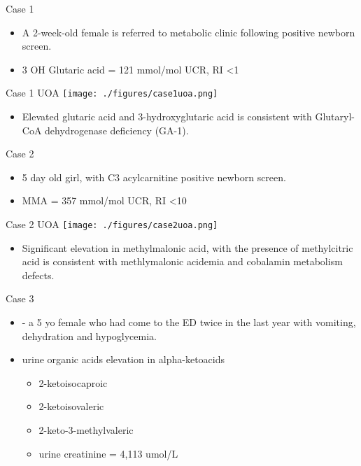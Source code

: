 \documentclass[presentation, smaller]{beamer}
\begin{document}
\begin{frame}[label={sec:orgheadline16}]{Case 1}
\begin{itemize}
\item A 2-week-old female is referred to metabolic clinic following positive newborn screen.
\item 3 OH Glutaric acid = 121 mmol/mol UCR, RI <1
\end{itemize}
\end{frame}

\begin{frame}[label={sec:orgheadline17}]{Case 1 UOA}
\texttt{[image: ./figures/case1uoa.png]}

\pause

\begin{itemize}
\item Elevated glutaric acid and 3-hydroxyglutaric acid is consistent with
Glutaryl-CoA dehydrogenase deficiency (GA-1).
\end{itemize}
\end{frame}

\begin{frame}[label={sec:orgheadline18}]{Case 2}
\begin{itemize}
\item 5 day old girl, with C3 acylcarnitine positive newborn screen.
\item MMA = 357 mmol/mol UCR, RI <10
\end{itemize}
\end{frame}


\begin{frame}[label={sec:orgheadline19}]{Case 2 UOA}
\texttt{[image: ./figures/case2uoa.png]}

\pause

\begin{itemize}
\item Significant elevation in methylmalonic acid, with the presence of
methylcitric acid is consistent with methlymalonic acidemia
and cobalamin metabolism defects.
\end{itemize}
\end{frame}

\begin{frame}[label={sec:orgheadline20}]{Case 3}
\begin{itemize}
\item - a 5 yo female who had come to the ED twice in the last year with
vomiting, dehydration and hypoglycemia.

\item urine organic acids elevation in alpha-ketoacids 
\begin{itemize}
\item 2-ketoisocaproic
\item 2-ketoisovaleric
\item 2-keto-3-methylvaleric
\item urine creatinine = 4,113 umol/L
\end{itemize}
\end{itemize}
\end{frame}
\end{document}
